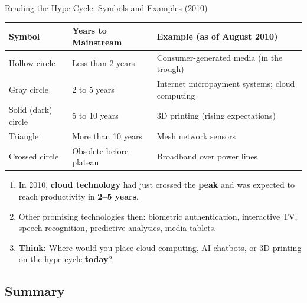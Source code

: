 \begin{frame}{Reading the Hype Cycle: Symbols and Examples (2010)}
\begin{table}
\centering
\renewcommand{\arraystretch}{1.25}
\scriptsize
\begin{tabular}{|p{3.2cm}|p{3.4cm}|p{6.4cm}|}
\hline
\textbf{Symbol} & \textbf{Years to Mainstream} & \textbf{Example (as of August 2010)} \\ \hline
Hollow circle & Less than 2 years & Consumer-generated media (in the trough) \\ \hline
Gray circle & 2 to 5 years & Internet micropayment systems; cloud computing \\ \hline
Solid (dark) circle & 5 to 10 years & 3D printing (rising expectations) \\ \hline
Triangle & More than 10 years & Mesh network sensors \\ \hline
Crossed circle & Obsolete before plateau & Broadband over power lines \\ \hline
\end{tabular}
\end{table}
\begin{enumerate}
\item<1-> In 2010, \textbf{cloud technology} had just crossed the \textbf{peak} and was expected to reach productivity in \textbf{2--5 years}.
\item<2-> Other promising technologies then: biometric authentication, interactive TV, speech recognition, predictive analytics, media tablets.
\item<3-> \textbf{Think:} Where would you place cloud computing, AI chatbots, or 3D printing on the hype cycle \textbf{today}?
\end{enumerate}
\end{frame}

\subsection{Summary}

